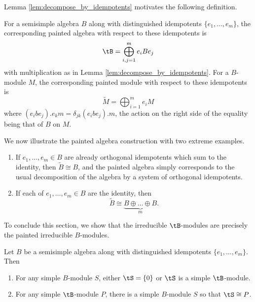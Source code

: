 Lemma \ref{lem:decompose_by_idempotents} motivates the following definition.

\begin{defi}
For a semisimple algebra $B$ along with distinguished idempotents $\{e_1,\dots,e_m\}$, the corresponding painted algebra with respect to these idempotents is \[\tB=\bigoplus_{i,j=1}^m e_i B e_j\] with multiplication as in Lemma \ref{lem:decompose_by_idempotents}. For a $B$-module $M$, the corresponding painted module with respect to these idempotents is \[\tilde{M}=\bigoplus_{i=1}^m e_i M\]  where $(e_i b e_j).e_k m=\delta_{jk}(e_ibe_j).m$, the action on the right side of the equality being that of $B$ on $M$.
\end{defi}

\begin{exam} We now illustrate the painted algebra construction with two extreme examples.
    
    \begin{enumerate}[label={\alph*}]
        \item[(a)] If $e_1,\dots,e_m\in B$ are already orthogonal idempotents which sum to the identity, then $\tilde{B}\cong B$, and the painted algebra simply corresponds to the usual decomposition of the algebra by a system of orthogonal idempotents.
        \item[(b)] If each of $e_1,\dots,e_m\in B$ are the identity, then \[\tilde{B}\cong\underbrace{B\oplus\dots\oplus B}_{m}.\]
    \end{enumerate}

\end{exam}

To conclude this section, we show that the irreducible $\tB$-modules are precisely the painted irreducible $B$-modules.

\begin{lemma}\label{lem:symmetrized_modules}
    Let $B$ be a semisimple algebra along with distinguished idempotents $\{e_1,\dots,e_m\}$. Then \begin{enumerate}
        \item For any simple $B$-module $S$, either $\tS=\{0\}$ or $\tS$ is a simple $\tB$-module.
        \item For any simple $\tB$-module $P$, there is a simple $B$-module $S$ so that $\tS\cong P$.
    \end{enumerate}
\end{lemma}

